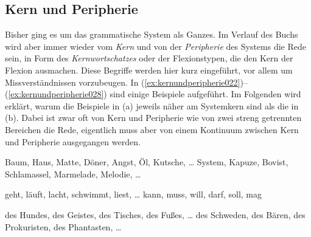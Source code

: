\subsection{Kern und Peripherie}
\label{sec:kernundperipherie}


Bisher ging es um das grammatische System als Ganzes.
Im Verlauf des Buchs wird aber immer wieder vom \textit{Kern} und von der \textit{Peripherie} des Systems die Rede sein, \zB in Form des \textit{Kernwortschatzes} oder der Flexionstypen, die den Kern der Flexion ausmachen.
Diese Begriffe werden hier kurz eingeführt, vor allem um Missverständnissen vorzubeugen.
In (\ref{ex:kernundperipherie022})--(\ref{ex:kernundperipherie028}) sind einige Beispiele aufgeführt.
Im Folgenden wird erklärt, warum die Beispiele in (a) jeweils näher am Systemkern sind als die in (b).
Dabei ist zwar oft von Kern und Peripherie wie von zwei streng getrennten Bereichen die Rede, eigentlich muss aber von einem Kontinuum zwischen Kern und Peripherie ausgegangen werden.

\begin{exe}
  \ex\label{ex:kernundperipherie022}
  \begin{xlist}
    \ex\label{ex:kernundperipherie023} Baum, Haus, Matte, Döner, Angst, Öl, Kutsche, \ldots
    \ex\label{ex:kernundperipherie024} System, Kapuze, Bovist, Schlamassel, Marmelade, Melodie, \ldots
  \end{xlist}
  \ex\label{ex:kernundperipherie025}
  \begin{xlist}
    \ex\label{ex:kernundperipherie026} geht, läuft, lacht, schwimmt, liest, \ldots
    \ex\label{ex:kernundperipherie027} kann, muss, will, darf, soll, mag
  \end{xlist}
  \ex\label{ex:kernundperipherie028}
  \begin{xlist}
    \ex\label{ex:kernundperipherie029} des Hundes, des Geistes, des Tisches, des Fußes, \ldots
    \ex\label{ex:kernundperipherie030} des Schweden, des Bären, des Prokuristen, des Phantasten, \ldots
  \end{xlist}
\end{exe}


